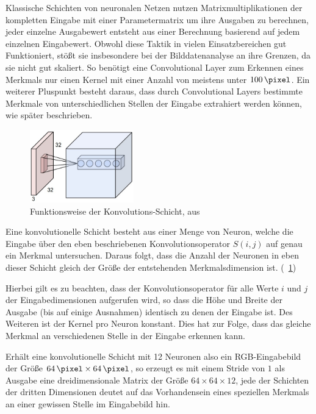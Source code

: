 Klassische Schichten von neuronalen Netzen nutzen Matrixmultiplikationen der kompletten Eingabe mit einer Parametermatrix um ihre Ausgaben zu berechnen, \dh jeder einzelne Ausgabewert entsteht aus einer Berechnung basierend auf jedem einzelnen Eingabewert. Obwohl diese Taktik in vielen Einsatzbereichen gut Funktioniert, stößt sie insbesondere bei der Bilddatenanalyse an ihre Grenzen, da sie nicht gut skaliert. \cite{cs231n} So benötigt eine Convolutional Layer zum Erkennen eines Merkmals nur einen Kernel mit einer Anzahl von meistens unter $\SI{100}{\pixel}$. \cite{deeplearning_16} Ein weiterer Pluspunkt besteht daraus, dass durch Convolutional Layers bestimmte Merkmale von unterschiedlichen Stellen der Eingabe extrahiert werden können, wie später beschrieben.

\begin{figure}[H]
	\centering
	\includegraphics[width=0.4\textwidth,keepaspectratio]{images/cs231n/convolutional.jpg}
	\caption{Funktionsweise der Konvolutions-Schicht, aus \cite{cs231n}}
	\label{fig:convolutional}
\end{figure}

Eine konvolutionelle Schicht besteht aus einer Menge von Neuron, welche die Eingabe über den eben beschriebenen Konvolutionsoperator $S(i,j)$ auf genau ein Merkmal untersuchen. Daraus folgt, dass die Anzahl der Neuronen in eben dieser Schicht gleich der Größe der entstehenden Merkmalsdimension ist. (\vgl \figurename~\ref{fig:convolutional})

Hierbei gilt es zu beachten, dass der Konvolutionsoperator für alle Werte $i$ und $j$ der Eingabedimensionen aufgerufen wird, so dass die Höhe und Breite der Ausgabe (bis auf einige Ausnahmen) identisch zu denen der Eingabe ist.
Des Weiteren ist der Kernel pro Neuron konstant. Dies hat \ua zur Folge, dass das gleiche Merkmal an verschiedenen Stelle in der Eingabe erkennen kann.

Erhält eine konvolutionelle Schicht mit 12 Neuronen also \bspw ein RGB-Eingabebild der Größe $\SI{64}{\pixel}\times\SI{64}{\pixel}$, so erzeugt es mit einem Stride von $1$ als Ausgabe eine dreidimensionale Matrix der Größe $64\times64\times12$, jede der Schichten der dritten Dimensionen deutet auf das Vorhandensein eines speziellen Merkmals an einer gewissen Stelle im Eingabebild hin.

